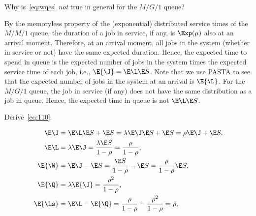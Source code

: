 \begin{exercise}\label{ex:l-216}
Why is~\cref{eq:wqes} \emph{not} true in general for the $M/G/1$ queue?
\begin{solution}
 By the memoryless property of the (exponential) distributed service times of the $M/M/1$ queue, the duration of a job in service, if any, is $\Exp(\mu)$ also at an arrival moment.
 Therefore, at an arrival moment, all jobs in the system (whether in service or not) have the same expected duration.
 Hence, the expected time to spend in queue is the expected number of jobs in the system times the expected service time of each job, i.e., $\E{\J} = \E \L \E S$.
 Note that we use PASTA to see that the expected number of jobs in the system at an arrival is $\E{\L}$.
 For the $M/G/1$ queue, the job in service (if any) does not have the same distribution as a job in queue.
 Hence, the expected time in queue is not $\E \L \E S$.
\end{solution}
\end{exercise}

\begin{exercise}\label{ex:l-215}
Derive~\cref{eq:110}.
\begin{solution}
\begin{align*}
 \E\J &= \E \L \E S + \E S = \lambda \E \J \E S + \E S= \rho \E \J + \E S, \\
 \E \L &= \lambda \E\J = \frac{\lambda \E S}{1-\rho} = \frac\rho{1-\rho}, \\
 \E{\W} &= \E\J - \E S = \frac{\E S}{1-\rho} - \E S = \frac{\rho}{1-\rho} \E S,\\
 \E{\Q} &= \lambda \E{\J} = \frac{\rho^2}{1-\rho}, \\
 \E{\Ls} &= \E \L - \E{\Q} = \frac{\rho}{1-\rho} - \frac{\rho^2}{1-\rho} = \rho,
\end{align*}
\end{solution}
\end{exercise}



